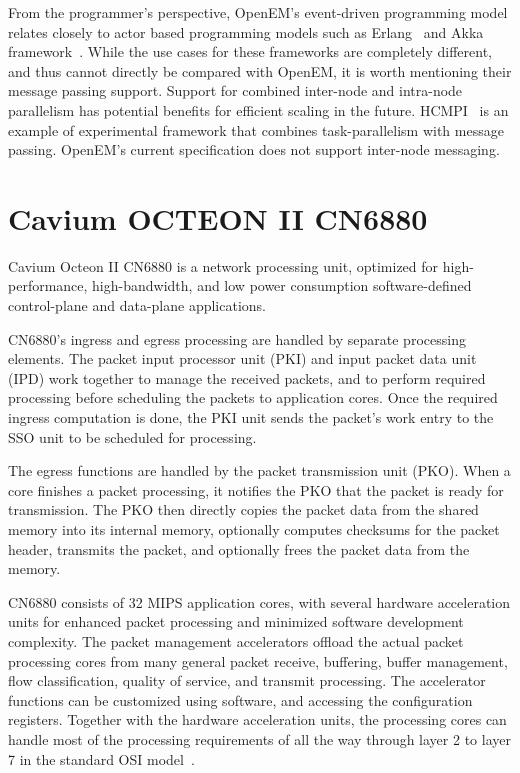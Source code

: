 From the programmer's perspective, OpenEM's event-driven programming model relates closely to actor based programming models such as Erlang~\cite{Armstrong:1993:Concurrent} and Akka framework~\cite{Akka}. While the use cases for these frameworks are completely different, and thus cannot directly be compared with OpenEM, it is worth mentioning their message passing support. Support for combined inter-node and intra-node parallelism has potential benefits for efficient scaling in the future. HCMPI~\cite{Chatterjee:2013:HCMPI} is an example of experimental framework that combines task-parallelism with message passing. OpenEM's current specification does not support inter-node messaging.

\section{Cavium OCTEON II CN6880}
\label{sec:cavium-octeon}
Cavium Octeon II CN6880 is a network processing unit, optimized for high-performance, high-bandwidth, and low power consumption software-defined control-plane and data-plane applications.

CN6880's ingress and egress processing are handled by separate processing elements. The packet input processor unit (PKI) and input packet data unit (IPD) work together to manage the received packets, and to perform required processing before scheduling the packets to application cores. Once the required ingress computation is done, the PKI unit sends the packet's work entry to the SSO unit to be scheduled for processing.~\cite{cavium:2010:fundamentals}

The egress functions are handled by the packet transmission unit (PKO). When a core finishes a packet processing, it notifies the PKO that the packet is ready for transmission. The PKO then directly copies the packet data from the shared memory into its internal memory, optionally computes checksums for the packet header, transmits the packet, and optionally frees the packet data from the memory.~\cite{cavium:2010:fundamentals}

CN6880 consists of 32 MIPS application cores, with several hardware acceleration units for enhanced packet processing and minimized software development complexity. The packet management accelerators offload the actual packet processing cores from many general packet receive, buffering, buffer management, flow classification, quality of service, and transmit processing. The accelerator functions can be customized using software, and accessing the configuration registers. Together with the hardware acceleration units, the processing cores can handle most of the processing requirements of all the way through layer 2 to layer 7 in the standard OSI model~\cite{ISO:1994:OSI}.~\cite{cavium:2010:fundamentals}

